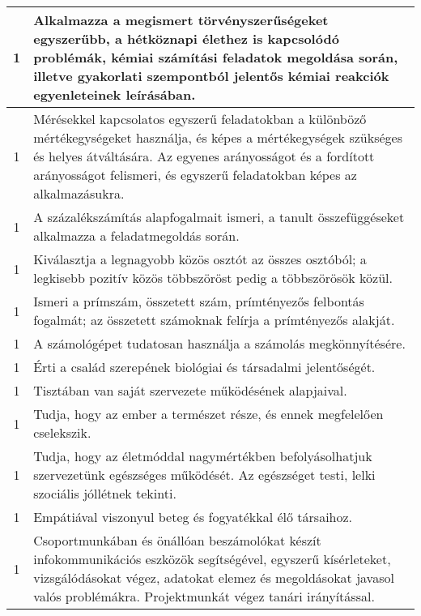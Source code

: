 \begin{longtable}{c | p{12cm} }
                                          1 &  Alkalmazza a megismert törvényszerűségeket egyszerűbb, a hétköznapi élethez is kapcsolódó problémák, kémiai számítási feladatok megoldása során, illetve gyakorlati szempontból jelentős kémiai reakciók egyenleteinek leírásában. \\ \hline
                                          1 &  Mérésekkel kapcsolatos egyszerű feladatokban a különböző mértékegységeket használja, és képes a mértékegységek szükséges és helyes átváltására. Az egyenes arányosságot és a fordított arányosságot felismeri, és egyszerű feladatokban képes az alkalmazásukra.
 \\ \hline
                                          1 &  A százalékszámítás alapfogalmait ismeri, a tanult összefüggéseket alkalmazza a  feladatmegoldás során. \\ \hline
                                          1 &  Kiválasztja a legnagyobb közös osztót az összes osztóból; a legkisebb pozitív közös többszöröst pedig a többszörösök közül. \\ \hline
                                          1 &  Ismeri a prímszám, összetett szám, prímtényezős felbontás fogalmát; az összetett számoknak felírja a prímtényezős alakját. \\ \hline
                                          1 &  A számológépet tudatosan használja a számolás megkönnyítésére. \\ \hline
                                          1 &  Érti a család szerepének biológiai és társadalmi jelentőségét. \\ \hline
                                          1 &  Tisztában van saját szervezete működésének alapjaival. \\ \hline
                                          1 &  Tudja, hogy az ember a természet része, és ennek megfelelően cselekszik. \\ \hline
                                          1 &  Tudja, hogy az életmóddal nagymértékben befolyásolhatjuk szervezetünk egészséges működését. Az egészséget testi, lelki szociális jóllétnek tekinti. \\ \hline
                                          1 &  Empátiával viszonyul beteg és fogyatékkal élő társaihoz. \\ \hline
                                          1 &  Csoportmunkában és önállóan beszámolókat készít infokommunikációs eszközök segítségével, egyszerű kísérleteket, vizsgálódásokat végez, adatokat elemez és megoldásokat javasol valós problémákra. Projektmunkát végez tanári irányítással. \\ \hline
                                      

\end{longtable}
